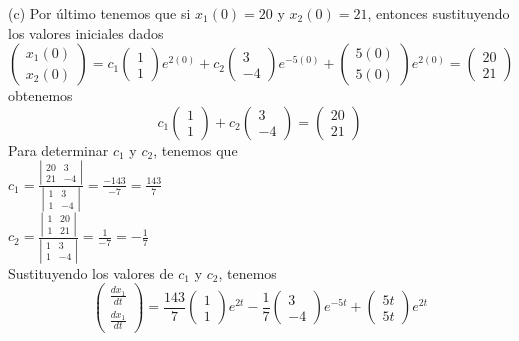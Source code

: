 (c) Por último tenemos que si $x_1(0) = 20$ y $x_2(0) = 21$, entonces sustituyendo los valores iniciales dados
$$\begin{pmatrix}
x_1(0)\\
x_2(0)
\end{pmatrix} = c_1 \begin{pmatrix}
1\\
1
\end{pmatrix}e^{2(0)} + c_2 \begin{pmatrix}
3\\
-4
\end{pmatrix}e^{-5(0)} + \begin{pmatrix}
5(0)\\
5(0)
\end{pmatrix}e^{2(0)} = \begin{pmatrix}
20\\
21
\end{pmatrix}$$
obtenemos
$$c_1 \begin{pmatrix}
1\\
1
\end{pmatrix} + c_2 \begin{pmatrix}
3\\
-4
\end{pmatrix} = \begin{pmatrix}
20\\
21
\end{pmatrix}$$
Para determinar $c_1$ y $c_2$, tenemos que
\\
$c_1 = \frac{\left|\begin{matrix}
20 & 3\\
21 & -4
\end{matrix} \right|}{\left|\begin{matrix}
1 & 3\\
1 & -4
\end{matrix} \right|} = \frac{-143}{-7} = \frac{143}{7}$\\
$c_2 = \frac{\left|\begin{matrix}
1 & 20\\
1 & 21
\end{matrix} \right|}{\left|\begin{matrix}
1 & 3\\
1 & -4
\end{matrix} \right|} = \frac{1}{-7} = -\frac{1}{7}$\\
Sustituyendo los valores de $c_1$ y $c_2$, tenemos
$$\begin{pmatrix}
\frac{dx_1}{dt}\\
\frac{dx_1}{dt}
\end{pmatrix} = \frac{143}{7} \begin{pmatrix}
     1\\
     1
     \end{pmatrix}e^{2t} - \frac{1}{7} \begin{pmatrix}
     3\\
     -4
     \end{pmatrix}e^{-5t} + \begin{pmatrix}
     5t\\
     5t
     \end{pmatrix}e^{2t}$$
